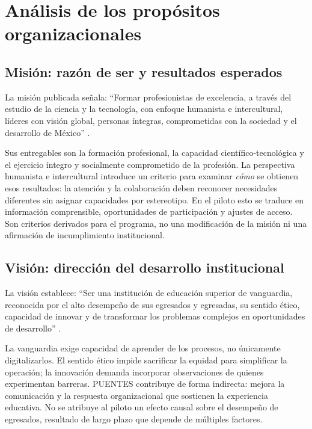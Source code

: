 \documentclass[12pt,letterpaper,oneside]{article}
\begin{document}
\section{Análisis de los propósitos organizacionales}
\subsection{Misión: razón de ser y resultados esperados}
La misión publicada señala: \enquote{Formar profesionistas de excelencia, a través del estudio de la ciencia y la tecnología, con enfoque humanista e intercultural, líderes con visión global, personas íntegras, comprometidas con la sociedad y el desarrollo de México} \parencite[sección Misión]{fga10filosofia}.

Sus entregables son la formación profesional, la capacidad científico-tecnológica y el ejercicio íntegro y socialmente comprometido de la profesión. La perspectiva humanista e intercultural introduce un criterio para examinar \emph{cómo} se obtienen esos resultados: la atención y la colaboración deben reconocer necesidades diferentes sin asignar capacidades por estereotipo. En el piloto esto se traduce en información comprensible, oportunidades de participación y ajustes de acceso. Son criterios derivados para el programa, no una modificación de la misión ni una afirmación de incumplimiento institucional.

\subsection{Visión: dirección del desarrollo institucional}
La visión establece: \enquote{Ser una institución de educación superior de vanguardia, reconocida por el alto desempeño de sus egresados y egresadas, su sentido ético, capacidad de innovar y de transformar los problemas complejos en oportunidades de desarrollo} \parencite[sección Visión]{fga10filosofia}.

La vanguardia exige capacidad de aprender de los procesos, no únicamente digitalizarlos. El sentido ético impide sacrificar la equidad para simplificar la operación; la innovación demanda incorporar observaciones de quienes experimentan barreras. PUENTES contribuye de forma indirecta: mejora la comunicación y la respuesta organizacional que sostienen la experiencia educativa. No se atribuye al piloto un efecto causal sobre el desempeño de egresados, resultado de largo plazo que depende de múltiples factores.
\end{document}
